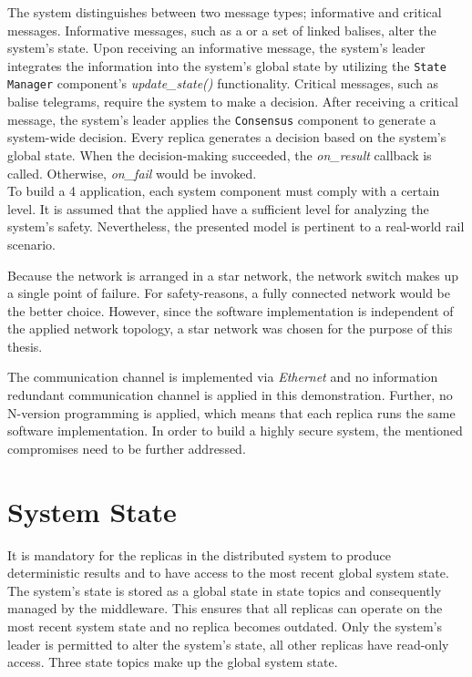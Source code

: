 The system distinguishes between two message types; informative and critical messages.
Informative messages, such as a  or a set of linked balises, alter the system's state.
Upon receiving an informative message, the system's leader integrates the information into the system's global state by utilizing the \texttt{State Manager} component's \textit{update\_state()} functionality.
Critical messages, such as balise telegrams, require the system to make a decision.
After receiving a critical message, the system's leader applies the \texttt{Consensus} component to generate a system-wide decision.
Every replica generates a decision based on the system's global state.
When the decision-making succeeded, the \textit{on\_result} callback is called.
Otherwise, \textit{on\_fail} would be invoked.
\\

To build a  4 application, each system component must comply with a certain  level.
It is assumed that the applied  have a sufficient  level for analyzing the system's safety.
Nevertheless, the presented model is pertinent to a real-world rail scenario.

Because the network is arranged in a star network, the network switch makes up a single point of failure.
For safety-reasons, a fully connected network would be the better choice.
However, since the software implementation is independent of the applied network topology, a star network was chosen for the purpose of this thesis.

The communication channel is implemented via \textit{Ethernet} and no information redundant communication channel is applied in this demonstration.
Further, no N-version programming is applied, which means that each replica runs the same software implementation.
In order to build a highly secure system, the mentioned compromises need to be further addressed.

\section{System State}
\label{sec:stateManager}
It is mandatory for the replicas in the distributed system to produce deterministic results and to have access to the most recent global system state.
The system's state is stored as a global state in  state topics and consequently managed by the middleware.
This ensures that all replicas can operate on the most recent system state and no replica becomes outdated.
Only the system's leader is permitted to alter the system's state, all other replicas have read-only access.
Three  state topics make up the global system state.
\\

